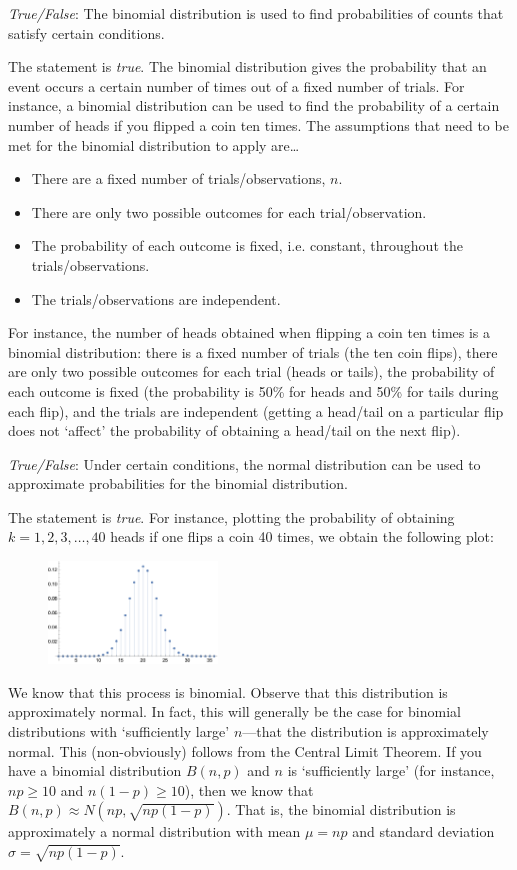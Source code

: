 \documentclass[11pt,letterpaper]{article}
\begin{document}
\quizsol \textit{True/False}: The binomial distribution is used to find probabilities of counts that satisfy certain conditions. \pspace

\sol The statement is \textit{true}. The binomial distribution gives the probability that an event occurs a certain number of times out of a fixed number of trials. For instance, a binomial distribution can be used to find the probability of a certain number of heads if you flipped a coin ten times. The assumptions that need to be met for the binomial distribution to apply are\dots
	\begin{itemize}
	\item There are a fixed number of trials/observations, $n$.
	\item There are only two possible outcomes for each trial/observation. 
	\item The probability of each outcome is fixed, i.e. constant, throughout the trials/observations.
	\item The trials/observations are independent. 
	\end{itemize}
For instance, the number of heads obtained when flipping a coin ten times is a binomial distribution: there is a fixed number of trials (the ten coin flips), there are only two possible outcomes for each trial (heads or tails), the probability of each outcome is fixed (the probability is 50\% for heads and 50\% for tails during each flip), and the trials are independent (getting a head/tail on a particular flip does not `affect' the probability of obtaining a head/tail on the next flip). \pvspace{1.3cm}



\quizsol \textit{True/False}: Under certain conditions, the normal distribution can be used to approximate probabilities for the binomial distribution. \pspace

\sol The statement is \textit{true}. For instance, plotting the probability of obtaining $k= 1, 2, 3, \ldots, 40$ heads if one flips a coin 40 times, we obtain the following plot: \par
	\begin{figure}[h]
	\centering
	\includegraphics[width=0.4\textwidth]{images/binomplot.png}
	\end{figure} \par
We know that this process is binomial. Observe that this distribution is approximately normal. In fact, this will generally be the case for binomial distributions with `sufficiently large' $n$---that the distribution is approximately normal. This (non-obviously) follows from the Central Limit Theorem. If you have a binomial distribution $B(n, p)$ and $n$ is `sufficiently large' (for instance, $np \geq 10$ and $n(1 - p) \geq 10$), then we know that $B(n, p) \approx N \left(np, \sqrt{np(1 - p)} \right)$. That is, the binomial distribution is approximately a normal distribution with mean $\mu= np$ and standard deviation $\sigma= \sqrt{np(1 - p)}$.  
\end{document}
